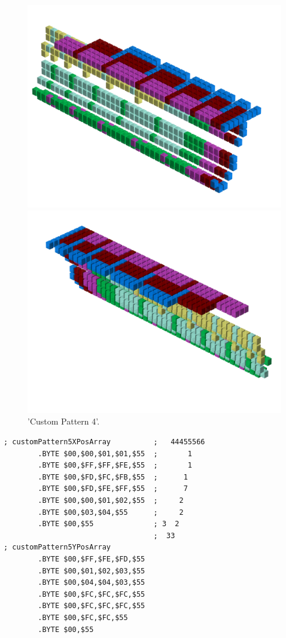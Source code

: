 \begin{figure}[H]
    \centering
    \begin{adjustbox}{width=12cm,center}
      \includegraphics[width=12cm]{src/patterns/pattern13-45.png}%
    \end{adjustbox}
    \begin{adjustbox}{width=12cm,margin=0cm -4cm}
      \includegraphics[width=12cm]{src/patterns/pattern13-225.png}%
    \end{adjustbox}
\caption{'Custom Pattern 4'.}
\end{figure}
\clearpage

\begin{lstlisting}
; customPattern5XPosArray          ;   44455566
        .BYTE $00,$00,$01,$01,$55  ;       1   
        .BYTE $00,$FF,$FF,$FE,$55  ;       1   
        .BYTE $00,$FD,$FC,$FB,$55  ;      1    
        .BYTE $00,$FD,$FE,$FF,$55  ;      7    
        .BYTE $00,$00,$01,$02,$55  ;     2     
        .BYTE $00,$03,$04,$55      ;     2     
        .BYTE $00,$55              ; 3  2      
                                   ;  33       
; customPattern5YPosArray
        .BYTE $00,$FF,$FE,$FD,$55
        .BYTE $00,$01,$02,$03,$55
        .BYTE $00,$04,$04,$03,$55
        .BYTE $00,$FC,$FC,$FC,$55
        .BYTE $00,$FC,$FC,$FC,$55
        .BYTE $00,$FC,$FC,$55
        .BYTE $00,$55
\end{lstlisting}


